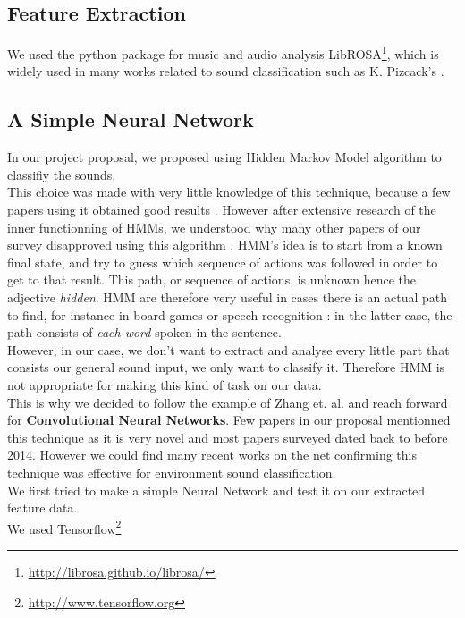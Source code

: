 \documentclass{article} %
\begin{document}
	\subsection{Feature Extraction}
		We used the python package for music and audio analysis LibROSA\footnote{\url{http://librosa.github.io/librosa/}}, which is widely used in many works related to sound classification such as K. Pizcack's \cite{cite2}.
	
	\subsection{A Simple Neural Network}
		In our project proposal, we proposed using Hidden Markov Model algorithm to classifiy the sounds.\\
		This choice was made with very little knowledge of this technique, because a few papers using it obtained good results \cite{cite3} \cite{cite4}. However after extensive research of the inner functionning of HMMs, we understood why many other papers of our survey disapproved using this algorithm \cite{cite5} \cite{cite6}. HMM's idea is to start from a known final state, and try to guess which sequence of actions was followed in order to get to that result. This path, or sequence of actions, is unknown hence the adjective \emph{hidden}. HMM are therefore very useful in cases there is an actual path to find, for instance in board games or speech recognition : in the latter case, the path consists of \emph{each word} spoken in the sentence.\\
		\newline
		However, in our case, we don't want to extract and analyse every little part that consists our general sound input, we only want to classify it. Therefore HMM is not appropriate for making this kind of task on our data.\\
		\newline
		This is why we decided to follow the example of Zhang et. al.\cite{cite6} and reach forward for \textbf{Convolutional Neural Networks}. Few papers in our proposal mentionned this technique as it is very novel and most papers surveyed dated back to before 2014. However we could find many recent works on the net confirming this technique was effective for environment sound classification.\\
		We first tried to make a simple Neural Network and test it on our extracted feature data.\\
		We used Tensorflow\footnote{\url{http://www.tensorflow.org}}
\end{document}
